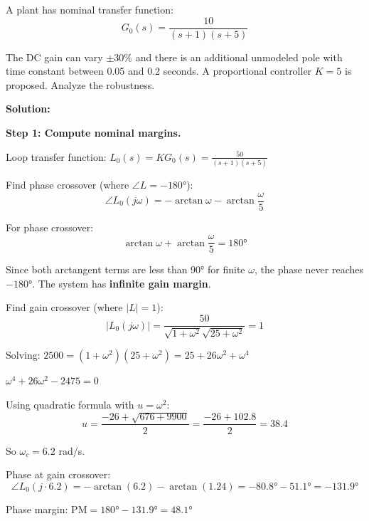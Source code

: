 \begin{example}
\label{ex:robustness_margins}
A plant has nominal transfer function:
\begin{equation}
G_0(s) = \frac{10}{(s+1)(s+5)}
\end{equation}

The DC gain can vary $\pm 30\%$ and there is an additional unmodeled pole with time constant between 0.05 and 0.2 seconds. A proportional controller $K = 5$ is proposed. Analyze the robustness.

\textbf{Solution:}

\textbf{Step 1: Compute nominal margins.}

Loop transfer function: $L_0(s) = KG_0(s) = \frac{50}{(s+1)(s+5)}$

Find phase crossover (where $\angle L = -180°$):
\begin{equation}
\angle L_0(j\omega) = -\arctan\omega - \arctan\frac{\omega}{5}
\end{equation}

For phase crossover:
\begin{equation}
\arctan\omega + \arctan\frac{\omega}{5} = 180°
\end{equation}

Since both arctangent terms are less than 90° for finite $\omega$, the phase never reaches $-180°$. The system has \textbf{infinite gain margin}.

Find gain crossover (where $|L| = 1$):
\begin{equation}
|L_0(j\omega)| = \frac{50}{\sqrt{1+\omega^2}\sqrt{25+\omega^2}} = 1
\end{equation}

Solving: $2500 = (1+\omega^2)(25+\omega^2) = 25 + 26\omega^2 + \omega^4$

$\omega^4 + 26\omega^2 - 2475 = 0$

Using quadratic formula with $u = \omega^2$:
\begin{equation}
u = \frac{-26 + \sqrt{676 + 9900}}{2} = \frac{-26 + 102.8}{2} = 38.4
\end{equation}

So $\omega_c = 6.2$ rad/s.

Phase at gain crossover:
\begin{equation}
\angle L_0(j\cdot 6.2) = -\arctan(6.2) - \arctan(1.24) = -80.8° - 51.1° = -131.9°
\end{equation}

Phase margin: $\text{PM} = 180° - 131.9° = 48.1°$


\end{example}
